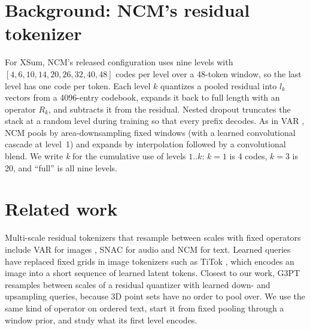 \documentclass[11pt]{article}
\begin{document}
\section{Background: NCM's residual tokenizer}
For XSum, NCM's released configuration uses nine levels with $[4,6,10,14,20,26,32,40,48]$ codes per level over a 48-token window, so the last level has one code per token. Each level $k$ quantizes a pooled residual into $l_k$ vectors from a 4096-entry codebook, expands it back to full length with an operator $R_k$, and subtracts it from the residual. Nested dropout \citep{rippel2014nested,kusupati2022matryoshka} truncates the stack at a random level during training so that every prefix decodes. As in VAR \citep{tian2024var}, NCM pools by area-downsampling fixed windows (with a learned convolutional cascade at level~1) and expands by interpolation followed by a convolutional blend. We write \emph{k} for the cumulative use of levels $1..k$: $k{=}1$ is 4 codes, $k{=}3$ is 20, and ``full'' is all nine levels.

\section{Related work}
Multi-scale residual tokenizers that resample between scales with fixed operators include VAR for images \citep{tian2024var}, SNAC for audio \citep{siuzdak2024snac} and NCM for text. Learned queries have replaced fixed grids in image tokenizers such as TiTok \citep{yu2024titok}, which encodes an image into a short sequence of learned latent tokens. Closest to our work, G3PT \citep{zhang2025g3pt} resamples between scales of a residual quantizer with learned down- and upsampling queries, because 3D point sets have no order to pool over. We use the same kind of operator on ordered text, start it from fixed pooling through a window prior, and study what its first level encodes.
\end{document}
